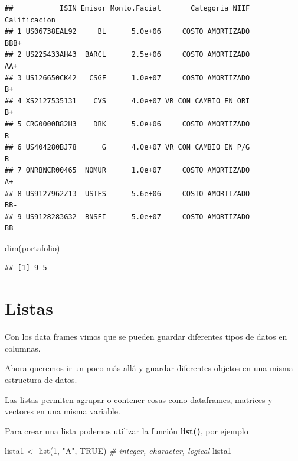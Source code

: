\documentclass[
  12pt,
]{book}
\newenvironment{Shaded}{\begin{snugshade}}{\end{snugshade}}
\newcommand{\CommentTok}[1]{\textcolor[rgb]{0.56,0.35,0.01}{\textit{#1}}}
\newcommand{\ConstantTok}[1]{\textcolor[rgb]{0.00,0.00,0.00}{#1}}
\newcommand{\DecValTok}[1]{\textcolor[rgb]{0.00,0.00,0.81}{#1}}
\newcommand{\FunctionTok}[1]{\textcolor[rgb]{0.00,0.00,0.00}{#1}}
\newcommand{\NormalTok}[1]{#1}
\newcommand{\OtherTok}[1]{\textcolor[rgb]{0.56,0.35,0.01}{#1}}
\newcommand{\StringTok}[1]{\textcolor[rgb]{0.31,0.60,0.02}{#1}}
\begin{document}
\begin{verbatim}
##           ISIN Emisor Monto.Facial       Categoria_NIIF Calificacion
## 1 US06738EAL92     BL      5.0e+06     COSTO AMORTIZADO         BBB+
## 2 US225433AH43  BARCL      2.5e+06     COSTO AMORTIZADO          AA+
## 3 US126650CK42   CSGF      1.0e+07     COSTO AMORTIZADO           B+
## 4 XS2127535131    CVS      4.0e+07 VR CON CAMBIO EN ORI           B+
## 5 CRG0000B82H3    DBK      5.0e+06     COSTO AMORTIZADO            B
## 6 US404280BJ78      G      4.0e+07 VR CON CAMBIO EN P/G            B
## 7 0NRBNCR00465  NOMUR      1.0e+07     COSTO AMORTIZADO           A+
## 8 US9127962Z13  USTES      5.6e+06     COSTO AMORTIZADO          BB-
## 9 US9128283G32  BNSFI      5.0e+07     COSTO AMORTIZADO           BB
\end{verbatim}

\begin{Shaded}
\begin{Highlighting}[]
\FunctionTok{dim}\NormalTok{(portafolio)}
\end{Highlighting}
\end{Shaded}

\begin{verbatim}
## [1] 9 5
\end{verbatim}

\hypertarget{listas}{%
\section{\texorpdfstring{\textbf{Listas}}{Listas}}\label{listas}}

Con los data frames vimos que se pueden guardar diferentes tipos de datos en columnas.

Ahora queremos ir un poco más allá y guardar diferentes objetos en una misma estructura de datos.

Las listas permiten agrupar o contener cosas como dataframes, matrices y vectores en una misma variable.

Para crear una lista podemos utilizar la función \textbf{list()}, por ejemplo

\begin{Shaded}
\begin{Highlighting}[]
\NormalTok{lista1 }\OtherTok{\textless{}{-}} \FunctionTok{list}\NormalTok{(}\DecValTok{1}\NormalTok{, }\StringTok{"A"}\NormalTok{, }\ConstantTok{TRUE}\NormalTok{) }\CommentTok{\# integer, character, logical}
\NormalTok{lista1}
\end{Highlighting}
\end{Shaded}
\end{document}
